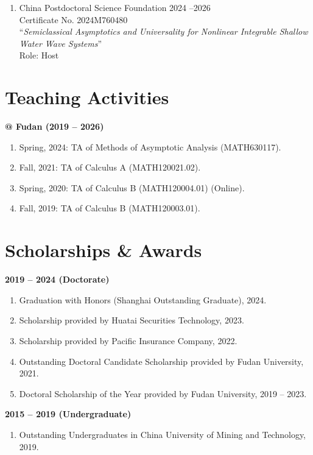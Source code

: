 \documentclass[margin]{res}
\begin{document}
\begin{resume}
\begin{enumerate}[--]
\item China Postdoctoral Science Foundation  \hfill 2024 --2026\\
Certificate No. 2024M760480\\
``{\sl Semiclassical Asymptotics and Universality for Nonlinear Integrable Shallow Water Wave Systems}'' \\
Role: Host
\end{enumerate}



\section{Teaching Activities}
\textbf{@ Fudan (2019 -- 2026)}
\begin{enumerate}[--]
\item Spring, 2024: TA of Methods of Asymptotic Analysis (MATH630117).
\item Fall, 2021: TA of Calculus A (MATH120021.02).
\item Spring, 2020: TA of Calculus B (MATH120004.01) (Online).
\item Fall, 2019: TA of Calculus B (MATH120003.01).
\end{enumerate}


\section{Scholarships \& Awards}
\textbf{2019 -- 2024 (Doctorate)}
\begin{enumerate}[--]
    \item Graduation with Honors (Shanghai Outstanding Graduate), 2024.
    \item Scholarship provided by Huatai Securities Technology, 2023.
    \item Scholarship provided by Pacific Insurance Company, 2022. 
    \item Outstanding Doctoral Candidate Scholarship provided by Fudan University, 2021. 
    \item Doctoral Scholarship of the Year provided by Fudan University, 2019 -- 2023. 
\end{enumerate}

\textbf{2015 -- 2019 (Undergraduate)}
\begin{enumerate}[--]
    \item Outstanding Undergraduates in China University of Mining and Technology, 2019.
\end{enumerate}



\end{resume}
\end{document}
